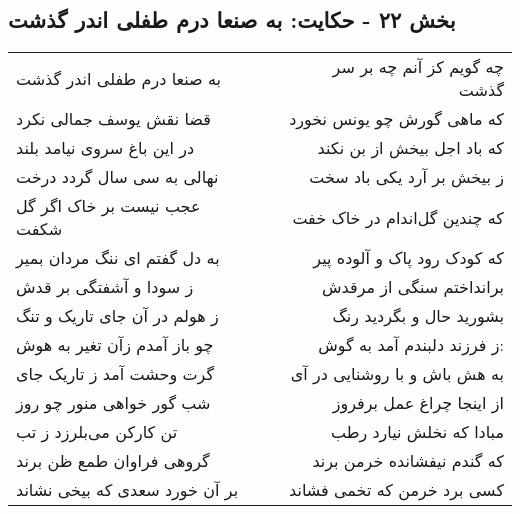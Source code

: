 \begin{center}
\section*{بخش ۲۲ - حکایت: به صنعا درم طفلی اندر گذشت}
\label{sec:022}
\begin{longtable}{l p{0.5cm} r}
به صنعا درم طفلی اندر گذشت
&&
چه گویم کز آنم چه بر سر گذشت
\\
قضا نقش یوسف جمالی نکرد
&&
که ماهی گورش چو یونس نخورد
\\
در این باغ سروی نیامد بلند
&&
که باد اجل بیخش از بن نکند
\\
نهالی به سی سال گردد درخت
&&
ز بیخش بر آرد یکی باد سخت
\\
عجب نیست بر خاک اگر گل شکفت
&&
که چندین گل‌اندام در خاک خفت
\\
به دل گفتم ای ننگ مردان بمیر
&&
که کودک رود پاک و آلوده پیر
\\
ز سودا و آشفتگی بر قدش
&&
برانداختم سنگی از مرقدش
\\
ز هولم در آن جای تاریک و تنگ
&&
بشورید حال و بگردید رنگ
\\
چو باز آمدم زآن تغیر به هوش
&&
ز فرزند دلبندم آمد به گوش:
\\
گرت وحشت آمد ز تاریک جای
&&
به هش باش و با روشنایی در آی
\\
شب گور خواهی منور چو روز
&&
از اینجا چراغ عمل برفروز
\\
تن کارکن می‌بلرزد ز تب
&&
مبادا که نخلش نیارد رطب
\\
گروهی فراوان طمع ظن برند
&&
که گندم نیفشانده خرمن برند
\\
بر آن خورد سعدی که بیخی نشاند
&&
کسی برد خرمن که تخمی فشاند
\\
\end{longtable}
\end{center}
